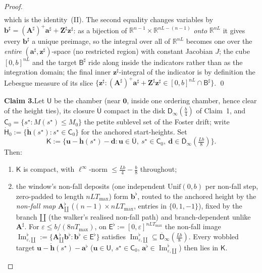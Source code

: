 \documentclass[11pt]{article}
\theoremstyle{definition}
\begin{document}
\begin{proof}
\begin{align*}
\end{align*}
which is the identity~(II). The second equality changes variables by $\mathbf{b}^{\sharp}=(\mathbf{A}^{\sharp})^{+}\mathbf{a}^{\sharp}+\mathbf{Z}^{\sharp}\mathbf{z}^{\sharp}$: as a bijection of $\mathbb{R}^{n-1}\times\mathbb{R}^{nL-(n-1)}$ \emph{onto} $\mathbb{R}^{nL}$ it gives every $\mathbf{b}^{\sharp}$ a unique preimage, so the integral over all of $\mathbb{R}^{nL}$ becomes one over the \emph{entire} $(\mathbf{a}^{\sharp},\mathbf{z}^{\sharp})$-space (no restricted region) with constant Jacobian $J$; the cube $[0,b]^{nL}$ and the target $\mathsf{B}^{\sharp}$ ride along inside the indicators rather than as the integration domain; the final inner $\mathbf{z}^{\sharp}$-integral of the indicator is by definition the Lebesgue measure of its slice $\{\mathbf{z}^{\sharp}:(\mathbf{A}^{\sharp})^{+}\mathbf{a}^{\sharp}+\mathbf{Z}^{\sharp}\mathbf{z}^{\sharp}\in[0,b]^{nL}\cap\mathsf{B}^{\sharp}\}$. \qed

\smallskip\noindent\textbf{Claim 3.}\quad Let $\mathsf{U}$ be the chamber (near $\mathbf{0}$, inside one ordering chamber, hence clear of the height ties), its closure $\overline{\mathsf{U}}$ compact in the disk $\mathsf{D}_\infty(\tfrac{b}{4})$ of Claim~1, and $\mathsf{C}_0 = \{s^{\star} : M(s^{\star}) \leq M_0\}$ the petite sublevel set of the Foster drift; write $\dot{\mathsf{H}}_0 := \{\mathring{\mathbf{h}}(s^{\star}) : s^{\star}\in\mathsf{C}_0\}$ for the anchored start-heights. Set
\[
  \mathsf{K} := \{\mathbf{u}-\mathring{\mathbf{h}}(s^{\star})-\mathbf{d} : \mathbf{u}\in\overline{\mathsf{U}},\ s^{\star}\in\mathsf{C}_0,\ \mathbf{d}\in\overline{\mathsf{D}}_\infty(\tfrac{Lb}{8})\} .
\]
Then:
\begin{enumerate}[label=(\Roman*)]
  \item $\mathsf{K}$ is compact, with $\ell^\infty$-norm $\leq \tfrac{Lb}{4} - \tfrac{b}{8}$ throughout;
  \item the window's non-fall deposits (one independent $\mathrm{Unif}(0,b)$ per non-fall step, zero-padded to length $nLT_{\max}$) form $\mathbf{b}^{\flat}$, routed to the anchored height by the \emph{non-fall map} $\mathbf{A}^{\flat}_{\amalg}$ ($(n-1)\times nLT_{\max}$, entries in $\{0,1,-1\}$), fixed by the branch $\amalg$ (the walker's realised non-fall path) and branch-dependent unlike $\mathbf{A}^{\sharp}$. For $\varepsilon \leq b/(8nT_{\max})$, on $\mathsf{E}^{\flat} := [0,\varepsilon]^{nLT_{\max}}$ the non-fall image $\operatorname{Im}^{\flat}_{\varepsilon,\amalg} := \{\mathbf{A}^{\flat}_{\amalg}\mathbf{b}^{\flat} : \mathbf{b}^{\flat}\in\mathsf{E}^{\flat}\}$ satisfies $\operatorname{Im}^{\flat}_{\varepsilon,\amalg}\subseteq\overline{\mathsf{D}}_\infty(\tfrac{Lb}{8})$. Every wobbled target $\mathbf{u}-\mathring{\mathbf{h}}(s^{\star})-\mathbf{a}^{\flat}$ ($\mathbf{u}\in\mathsf{U}$, $s^{\star}\in\mathsf{C}_0$, $\mathbf{a}^{\flat}\in\operatorname{Im}^{\flat}_{\varepsilon,\amalg}$) then lies in $\mathsf{K}$.
\end{enumerate}


\end{proof}
\end{document}
